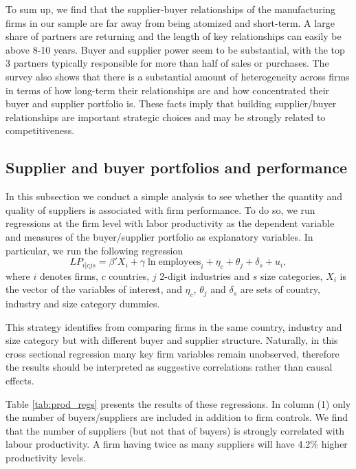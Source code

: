 \documentclass[final, dvipsnames, authoryear,12pt]{elsarticle}
\begin{document}
To sum up, we find that the supplier-buyer relationships of the manufacturing firms in our sample are far away from being atomized and short-term. A large share of partners are returning and the length of key relationships can easily be above 8-10 years. Buyer and supplier power seem to be substantial, with the top 3 partners typically responsible for more than half of sales or purchases. The survey also shows that there is a substantial amount of heterogeneity across firms in terms of how long-term their relationships are and how concentrated their buyer and supplier portfolio is. These facts imply that building supplier/buyer relationships are important strategic choices and may be strongly related to competitiveness.


\subsection{Supplier and buyer portfolios and performance}

In this subsection we conduct a simple analysis to see whether the quantity and quality of suppliers is associated with firm performance. To do so, we run regressions at the firm level with labor productivity as the dependent variable and measures of the buyer/supplier portfolio as explanatory variables. In particular, we run the following regression
\begin{equation}
    LP_{i|cjs}=\beta' X_{i}+\gamma \ln \text{employees}_i+\eta_c+\theta_j+\delta_s+u_i,
\end{equation}{}
where $i$ denotes firms, $c$ countries, $j$ 2-digit industries and $s$ size categories, $X_{i}$ is the vector of the variables of interest, and $\eta_c$, $\theta_j$ and $\delta_s$ are sets of country, industry and size category dummies. 

This strategy identifies from comparing firms in the same country, industry and size category but with different buyer and supplier structure. Naturally, in this cross sectional regression many key firm variables remain unobserved, therefore the results should be interpreted as suggestive correlations rather than causal effects.

Table \ref{tab:prod_regs} presents the results of these regressions. In column (1) only the number of buyers/suppliers are included in addition to firm controls. We find that the number of suppliers (but not that of buyers) is strongly correlated with labour productivity. A firm having twice as many suppliers will have 4.2\% higher productivity levels. 
\end{document}

